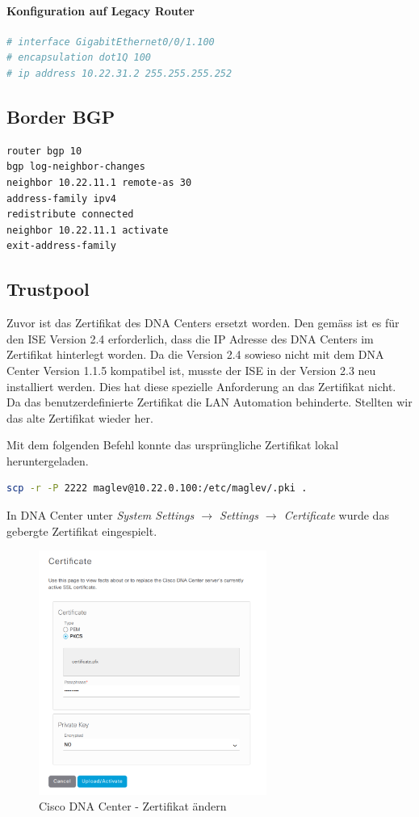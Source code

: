\paragraph{Konfiguration auf Legacy Router}
\begin{lstlisting}[language=bash]
# interface GigabitEthernet0/0/1.100
# encapsulation dot1Q 100
# ip address 10.22.31.2 255.255.255.252
\end{lstlisting}

\subsection{Border BGP}
\begin{lstlisting}[language=bash]
router bgp 10
bgp log-neighbor-changes
neighbor 10.22.11.1 remote-as 30
address-family ipv4
redistribute connected
neighbor 10.22.11.1 activate
exit-address-family
\end{lstlisting}

\subsection{Trustpool}
Zuvor ist das Zertifikat des DNA Centers ersetzt worden. Den gemäss \cite{cisco-dna-appliance-installation-guide-release-1-1} ist es für den ISE Version 2.4 erforderlich, dass die IP Adresse des DNA Centers im Zertifikat hinterlegt worden. Da die Version 2.4 sowieso nicht mit dem DNA Center Version 1.1.5 kompatibel ist, musste der ISE in der Version 2.3 neu installiert werden. Dies hat diese spezielle Anforderung an das Zertifikat nicht. Da das benutzerdefinierte Zertifikat die LAN Automation behinderte. Stellten wir das alte Zertifikat wieder her.

Mit dem folgenden Befehl konnte das ursprüngliche Zertifikat lokal heruntergeladen.

\begin{lstlisting}[language=bash]
scp -r -P 2222 maglev@10.22.0.100:/etc/maglev/.pki .
\end{lstlisting}

In DNA Center unter \textit{System Settings $\rightarrow$ Settings $\rightarrow$ Certificate} wurde das gebergte Zertifikat eingespielt. 

\begin{figure}[H]
	\centering
	\includegraphics[height=8cm]{img/secondtry/dna-center-replace-certificate.png}
	\caption{Cisco DNA Center - Zertifikat ändern}
	\label{fig:dna-zertificate-1}
\end{figure}



